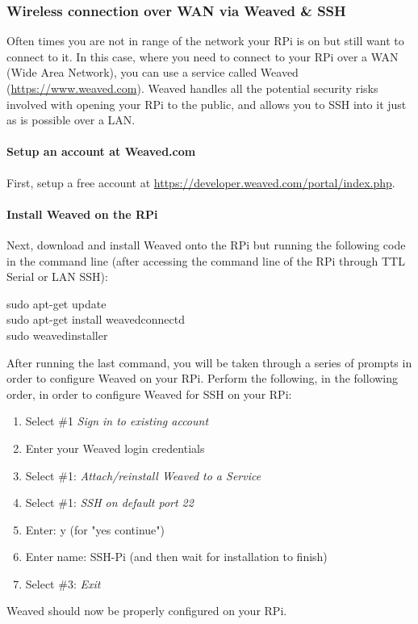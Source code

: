 \documentclass{article}
\newcommand*{\myfont}{\fontfamily{pcr}\selectfont}
\newcommand{\codeb}[2]{
  \begin{tcolorbox}[width=\textwidth,colback={SpringGreen},title={#1},colbacktitle=darkgreen,coltitle=SpringGreen]
    \myfont
    #2
  \end{tcolorbox}
} %
\begin{document}
  \subsubsection{Wireless connection over WAN via Weaved \& SSH}
  \label{sec:connect-sshwan}
    Often times you are not in range of the network your RPi is on but still want to connect to it. In this case, where you need to connect to your RPi over a WAN (Wide Area Network), you can use a service called Weaved (\href{https://www.weaved.com}{https://www.weaved.com}). Weaved handles all the potential security risks involved with opening your RPi to the public, and allows you to SSH into it just as is possible over a LAN.
    \paragraph{Setup an account at Weaved.com}
    First, setup a free account at \href{https://developer.weaved.com/portal/index.php}{https://developer.weaved.com/portal/index.php}.
    \paragraph{Install Weaved on the RPi}
    Next, download and install Weaved onto the RPi but running the following code in the command line (after accessing the command line of the RPi through TTL Serial or LAN SSH):
    \codeb{Download and install Weaved to the RPi}
    {
      sudo apt-get update \\
      sudo apt-get install weavedconnectd \\
      sudo weavedinstaller \\
    }
    After running the last command, you will be taken through a series of prompts in order to configure Weaved on your RPi. Perform the following, in the following order, in order to configure Weaved for SSH on your RPi:
    \begin{enumerate}
      \item Select \#1 \textit{Sign in to existing account}
      \item Enter your Weaved login credentials
      \item Select \#1: \textit{Attach/reinstall Weaved to a Service}
      \item Select \#1: \textit{SSH on default port 22}
      \item Enter: y (for "yes continue")
      \item Enter name: SSH-Pi (and then wait for installation to finish)
      \item Select \#3: \textit{Exit}
    \end{enumerate}
    Weaved should now be properly configured on your RPi.
\end{document}
